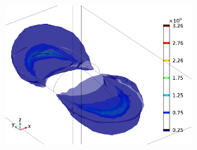 \begin{figure}[h]
    \begin{subfigure}{0.49\textwidth}
    \begin{subfigure}{\textwidth}
        \centering
        \includegraphics[width=0.9\linewidth]{figures/ch4/S5B/fielddistr/s5b_normE_TM_wl1010_phi90(2).png}
    \end{subfigure}
    

\end{subfigure}
\end{figure}
